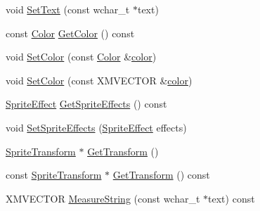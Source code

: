 \begin{DoxyCompactItemize}
void \hyperlink{classmage_1_1_sprite_text_a03d5012e2812d422a1285a4a0abb104f}{Set\+Text} (const wchar\+\_\+t $\ast$text)
\item 
const \hyperlink{structmage_1_1_color}{Color} \hyperlink{classmage_1_1_sprite_text_ac974d6c3ce1c66165222df73a088b4e4}{Get\+Color} () const
\item 
void \hyperlink{classmage_1_1_sprite_text_acaeb6686d0a5d89d799dd3ac4390a242}{Set\+Color} (const \hyperlink{structmage_1_1_color}{Color} \&\hyperlink{namespacemage_a56eceea5a9bceb2b56073f3ea4945781}{color})
\item 
void \hyperlink{classmage_1_1_sprite_text_ab3930318d6dca0589de4490ed629a3b8}{Set\+Color} (const X\+M\+V\+E\+C\+T\+OR \&\hyperlink{namespacemage_a56eceea5a9bceb2b56073f3ea4945781}{color})
\item 
\hyperlink{namespacemage_a9cfe18123066ba4236f548f9de75d881}{Sprite\+Effect} \hyperlink{classmage_1_1_sprite_text_a8a97ddf71ed3fd656f0f21b981f8e905}{Get\+Sprite\+Effects} () const
\item 
void \hyperlink{classmage_1_1_sprite_text_aedce1cc8bca6f038b618044ddfadcf6a}{Set\+Sprite\+Effects} (\hyperlink{namespacemage_a9cfe18123066ba4236f548f9de75d881}{Sprite\+Effect} effects)
\item 
\hyperlink{structmage_1_1_sprite_transform}{Sprite\+Transform} $\ast$ \hyperlink{classmage_1_1_sprite_text_a1ba88df7fac17dc88d958fa4a841b7f1}{Get\+Transform} ()
\item 
const \hyperlink{structmage_1_1_sprite_transform}{Sprite\+Transform} $\ast$ \hyperlink{classmage_1_1_sprite_text_a6e2baafdb30e47405f6199ca24194934}{Get\+Transform} () const
\item 
X\+M\+V\+E\+C\+T\+OR \hyperlink{classmage_1_1_sprite_text_a648398498414155f5072c771dca1a031}{Measure\+String} (const wchar\+\_\+t $\ast$text) const
\end{DoxyCompactItemize}
